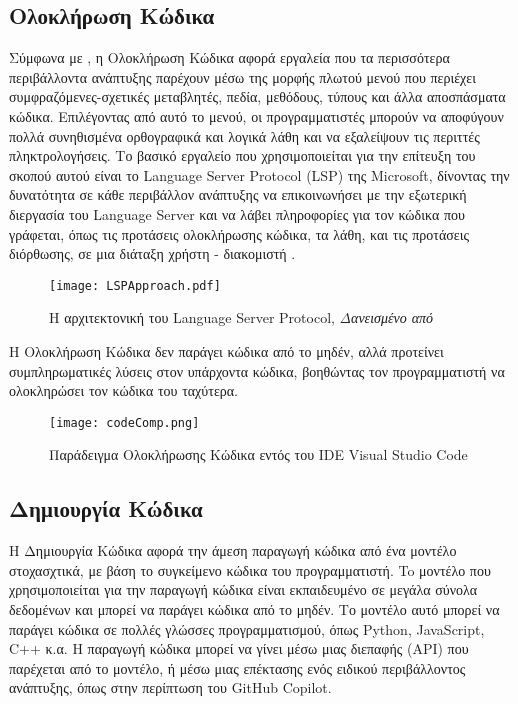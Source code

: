 \subsection*{Ολοκλήρωση Κώδικα} Σύμφωνα με
\textlatin{\citeauthor{Omar2012}} \cite{Omar2012}, η Ολοκλήρωση Κώδικα
αφορά εργαλεία που τα περισσότερα περιβάλλοντα ανάπτυξης παρέχουν μέσω
της μορφής πλωτού μενού που περιέχει συμφραζόμενες-σχετικές μεταβλητές,
πεδία, μεθόδους, τύπους και άλλα αποσπάσματα κώδικα. Επιλέγοντας από
αυτό το μενού, οι προγραμματιστές μπορούν να αποφύγουν πολλά συνηθισμένα
ορθογραφικά και λογικά λάθη και να εξαλείψουν τις περιττές
πληκτρολογήσεις. Το βασικό εργαλείο που χρησιμοποιείται για την επίτευξη
του σκοπού αυτού είναι το \textlatin{Language Server Protocol (LSP)} της
\textlatin{Microsoft}, δίνοντας την δυνατότητα σε κάθε περιβάλλον
ανάπτυξης να επικοινωνήσει με την εξωτερική διεργασία του
\textlatin{Language Server} και να λάβει πληροφορίες για τον κώδικα που
γράφεται, όπως τις προτάσεις ολοκλήρωσης κώδικα, τα λάθη, και τις
προτάσεις διόρθωσης, σε μια διάταξη χρήστη - διακομιστή \cite{Rask2022,
  Bunder2019}.

\begin{figure}[H]
  \begin{center}
    \texttt{[image: LSPApproach.pdf]}
    \label{fig:LSP_architecture}
    \caption{Η αρχιτεκτονική του \textlatin{Language Server Protocol},
      \textit{Δανεισμένο από \cite{Rodriguez-Echeverria2018}}}
  \end{center}
\end{figure}

Η Ολοκλήρωση Κώδικα δεν παράγει κώδικα από το μηδέν, αλλά προτείνει
συμπληρωματικές λύσεις στον υπάρχοντα κώδικα, βοηθώντας τον
προγραμματιστή να ολοκληρώσει τον κώδικα του ταχύτερα.

\begin{figure}[H]
  \begin{center}
    \texttt{[image: codeComp.png]}
    \label{fig:codeComp}
    \caption{Παράδειγμα Ολοκλήρωσης Κώδικα εντός του \textlatin{IDE}
      \textlatin{Visual Studio Code} }
  \end{center}
\end{figure}

\subsection*{Δημιουργία Κώδικα} Η Δημιουργία Κώδικα αφορά την άμεση
παραγωγή κώδικα από ένα μοντέλο στοχασχτικά, με βάση το συγκείμενο
κώδικα του προγραμματιστή. To μοντέλο που χρησιμοποιείται για την
παραγωγή κώδικα είναι εκπαιδευμένο σε μεγάλα σύνολα δεδομένων και μπορεί
να παράγει κώδικα από το μηδέν. Το μοντέλο αυτό μπορεί να παράγει κώδικα
σε πολλές γλώσσες προγραμματισμού, όπως \textlatin{Python, JavaScript,
  C++} κ.α. Η παραγωγή κώδικα μπορεί να γίνει μέσω μιας διεπαφής
\textlatin{(API)} που παρέχεται από το μοντέλο, ή μέσω μιας επέκτασης
ενός ειδικού περιβάλλοντος ανάπτυξης, όπως στην περίπτωση του
\textlatin{GitHub Copilot}.

